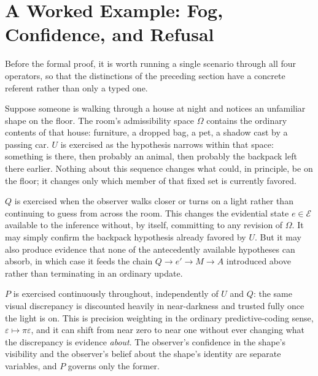 \documentclass[11pt]{article}
\begin{document}
\section{A Worked Example: Fog, Confidence, and Refusal}

Before the formal proof, it is worth running a single scenario through all four operators, so that the distinctions of the preceding section have a concrete referent rather than only a typed one.

Suppose someone is walking through a house at night and notices an unfamiliar shape on the floor. The room's admissibility space $\Omega$ contains the ordinary contents of that house: furniture, a dropped bag, a pet, a shadow cast by a passing car. $U$ is exercised as the hypothesis narrows within that space: something is there, then probably an animal, then probably the backpack left there earlier. Nothing about this sequence changes what could, in principle, be on the floor; it changes only which member of that fixed set is currently favored.

$Q$ is exercised when the observer walks closer or turns on a light rather than continuing to guess from across the room. This changes the evidential state $e \in \mathcal{E}$ available to the inference without, by itself, committing to any revision of $\Omega$. It may simply confirm the backpack hypothesis already favored by $U$. But it may also produce evidence that none of the antecedently available hypotheses can absorb, in which case it feeds the chain $Q \rightarrow e' \rightarrow M \rightarrow A$ introduced above rather than terminating in an ordinary update.

$P$ is exercised continuously throughout, independently of $U$ and $Q$: the same visual discrepancy is discounted heavily in near-darkness and trusted fully once the light is on. This is precision weighting in the ordinary predictive-coding sense, $\varepsilon \mapsto \pi \varepsilon$, and it can shift from near zero to near one without ever changing what the discrepancy is evidence \emph{about}. The observer's confidence in the shape's visibility and the observer's belief about the shape's identity are separate variables, and $P$ governs only the former.
\end{document}
